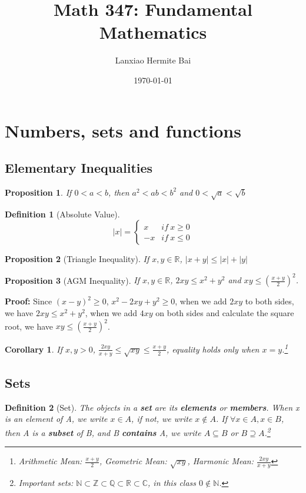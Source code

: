 \documentclass[12pt]{article}
\title{Math 347: Fundamental Mathematics}
\author{Lanxiao Hermite Bai}
\date{\today}
\newtheorem{definition}{Definition}[subsection]
\newtheorem{proposition}{Proposition}[subsection]
\newtheorem{corollary}{Corollary}[subsection]
\begin{document}
\maketitle
\newpage

\tableofcontents
\newpage

\section{Numbers, sets and functions}
    \subsection{Elementary Inequalities}
    \begin{proposition}
        If $0 < a < b$, then $a^2 < ab < b^2$ and $0 < \sqrt{a} < \sqrt{b}$
    \end{proposition}
    
    \begin{definition}[Absolute Value]
        \[|x| = \left\{ \begin{array}{ll} x & if\ x \geq 0 \\ -x & if\ x \leq 0 \end{array}\right.\]
    \end{definition}
    \begin{proposition}[Triangle Inequality]
        If $x, y \in \mathbb{R}$, $|x+y| \leq |x| 
        + |y|$
    \end{proposition}
    \begin{proposition}[AGM Inequality]
        If $x, y \in \mathbb{R}$, $2xy \leq x^2 + y^2$ and $xy \leq (\frac{x+y}{2})^2$.
    \end{proposition}
    
    \textbf{Proof:}
        Since $(x - y)^2 \geq 0$, $x^2 -2xy + y^2 \geq 0$, when we add $2xy$ to both sides, we have $2xy \leq x^2 + y^2$, when we add $4xy$ on both sides and calculate the square root, we have $xy \leq (\frac{x+y}{2})^2$.
    
    \begin{corollary}
        If $x, y > 0$, $\frac{2xy}{x+y} \leq \sqrt{xy} \leq \frac{x+y}{2}$, equality holds only when $x = y$.\footnote{Arithmetic Mean: $\frac{x+y}{2}$, Geometric Mean: $\sqrt{xy}$, Harmonic Mean: $\frac{2xy}{x+y}$}
    \end{corollary}
    \subsection{Sets}
        \begin{definition}[Set]
            The objects in a \textbf{set} are its \textbf{elements} or \textbf{members}. When x is an element of A, we write $x \in A$, if not, we write $x \notin A$. If $\forall x \in A, x \in B$, then A is a \textbf{subset} of B, and B \textbf{contains} A, we write $A \subseteq B$ or $B \supseteq A$.\footnote{Important sets: $\mathbb{N} \subset \mathbb{Z} \subset \mathbb{Q} \subset \mathbb{R} \subset \mathbb{C}$, in this class $0 \notin \mathbb{N}$.}
        \end{definition}
\end{document}
